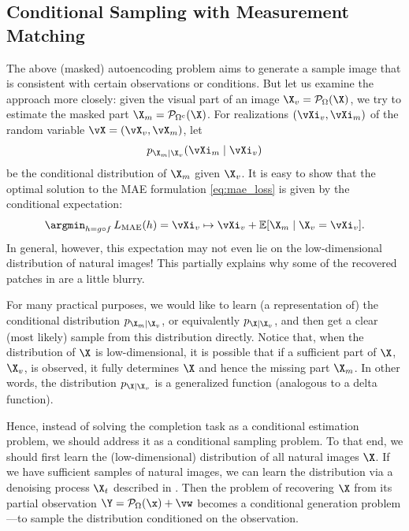 \documentclass[../../book-main.tex]{subfiles}
\begin{document}
\subsection{Conditional Sampling with Measurement Matching}
\label{sec:conditioned-decoding}
The above (masked) autoencoding problem aims to generate a sample
image that is consistent with certain observations or conditions. But
let us examine the approach more closely: given the
visual part of an image $\X_v = \mathcal{P}_{\Omega}(\X)$, we try to
estimate the masked part $\X_m = \mathcal{P}_{\Omega^c}(\X)$. For realizations
$(\vXi_v, \vXi_m)$ of the random variable $\vX=(\vX_v, \vX_m)$, let
\[p_{\X_m \mid \X_v}(\vXi_m\mid \vXi_v)\]
be the conditional distribution of $\X_m$ given
$\X_v$. It is easy to show that the optimal solution to the MAE
formulation \eqref{eq:mae_loss} is given by the conditional expectation:
\begin{equation}
    \argmin_{h = g \circ f}\, L_{\mathrm{MAE}}(h)
    = \vXi_v \mapsto \vXi_v + \mathbb{E}[\X_m \mid \X_v=\vXi_v].
\end{equation}
In general, however, this expectation may not even lie on the
low-dimensional distribution of natural images! This partially
explains why some of the recovered patches in 
are a little blurry.

For many practical purposes, we would like to learn (a representation
of) the conditional distribution $p_{\X_m \mid \X_v}$, or equivalently
$p_{\X \mid \X_v}$,
and then get a clear (most likely) sample from this distribution
directly. Notice that, when the distribution of $\X$ is
low-dimensional, it is possible that if a
sufficient part of $\X$, $\X_v$, is observed, it fully determines
$\X$ and hence the missing part $\X_m$. In other words, the distribution
$p_{\X \mid \X_v}$ is a generalized function (analogous to a delta function).

Hence, instead of solving the completion task as a conditional
estimation problem, we should address it as a conditional sampling
problem. To that end, we should first learn the (low-dimensional)
distribution of all natural images $\X$. If we have sufficient
samples of natural images, we can learn the distribution via a
denoising process $\X_t$ described in . Then the
problem of recovering $\X$ from its partial observation $\Y =
\mathcal{P}_\Omega(\x) +\vw$ becomes a conditional generation problem---to sample the distribution conditioned on the observation.
\end{document}
